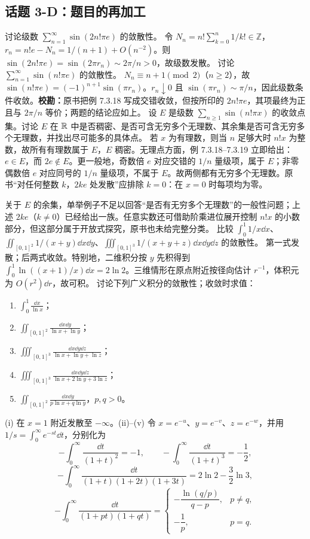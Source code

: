 \subsection*{话题 3-D：题目的再加工}
讨论级数 $\sum_{n=1}^\infty\sin(2n!\pi e)$ 的敛散性。
\sol 令 $N_n=n!\sum_{k=0}^n1/k!\in\mathbb Z$，$r_n=n!e-N_n=1/(n+1)+O(n^{-2})$。则 $\sin(2n!\pi e)=\sin(2\pi r_n)\sim2\pi/n>0$，故级数发散。
讨论 $\sum_{n=1}^\infty\sin(n!\pi e)$ 的敛散性。
\sol $N_n\equiv n+1\pmod2$（$n\ge2$），故 $\sin(n!\pi e)=(-1)^{n+1}\sin(\pi r_n)$。$r_n\downarrow0$ 且 $\sin(\pi r_n)\sim\pi/n$，因此级数条件收敛。\textbf{校勘：}原书把例 7.3.18 写成交错收敛，但按所印的 $2n!\pi e$，其项最终为正且与 $2\pi/n$ 等价；两题的结论应如上。
设 $E$ 是级数 $\sum_{n\ge1}\sin(n!\pi x)$ 的收敛点集。讨论 $E$ 在 $\mathbb R$ 中是否稠密、是否可含无穷多个无理数、其余集是否可含无穷多个无理数，并找出尽可能多的具体点。
\sol 若 $x$ 为有理数，则当 $n$ 足够大时 $n!x$ 为整数，故所有有理数属于 $E$，$E$ 稠密。无理点方面，例 7.3.18--7.3.19 立即给出：$e\in E$，而 $2e\notin E$。更一般地，奇数倍 $e$ 对应交错的 $1/n$ 量级项，属于 $E$；非零偶数倍 $e$ 对应同号的 $1/n$ 量级项，不属于 $E$。故两侧都有无穷多个无理数。原书“对任何整数 $k$，$2ke$ 处发散”应排除 $k=0$：在 $x=0$ 时每项均为零。
\par 关于 $E$ 的余集，单举例子不足以回答“是否有无穷多个无理数”的一般性问题；上述 $2ke$（$k\ne0$）已经给出一族。任意实数还可借助阶乘进位展开控制 $n!x$ 的小数部分，但这部分属于开放式探究，原书也未给完整分类。
比较 $\int_0^1\!1/x\dd x$、$\iint_{[0,1]^2}\!1/(x+y)\dd x\dd y$、$\iiint_{[0,1]^3}\!1/(x+y+z)\dd x\dd y\dd z$ 的敛散性。
\sol 第一式发散；后两式收敛。特别地，二维积分按 $y$ 先积得到 $\int_0^1\ln((x+1)/x)\dd x=2\ln2$。三维情形在原点附近按径向估计 $r^{-1}$，体积元为 $O(r^2)\dd r$，故可积。
讨论下列广义积分的敛散性；收敛时求值：
\begin{enumerate}[label=(\roman*)]
\item $\displaystyle\int_0^1\frac{\dd x}{\ln x}$；
\item $\displaystyle\iint_{[0,1]^2}\frac{\dd x\dd y}{\ln x+\ln y}$；
\item $\displaystyle\iiint_{[0,1]^3}\frac{\dd x\dd y\dd z}{\ln x+\ln y+\ln z}$；
\item $\displaystyle\iiint_{[0,1]^3}\frac{\dd x\dd y\dd z}{\ln x+2\ln y+3\ln z}$；
\item $\displaystyle\iint_{[0,1]^2}\frac{\dd x\dd y}{p\ln x+q\ln y}$，$p,q>0$。
\end{enumerate}
\sol (i) 在 $x=1$ 附近发散至 $-\infty$。(ii)--(v) 令 $x=e^{-u}$、$y=e^{-v}$、$z=e^{-w}$，并用 $1/s=\int_0^\infty e^{-st}\dd t$，分别化为
\[-\int_0^\infty\frac{\dd t}{(1+t)^2}=-1,\qquad
-\int_0^\infty\frac{\dd t}{(1+t)^3}=-\frac12,\]
\[-\int_0^\infty\frac{\dd t}{(1+t)(1+2t)(1+3t)}=2\ln2-\frac32\ln3,\]
\[-\int_0^\infty\frac{\dd t}{(1+pt)(1+qt)}=
\begin{cases}-\dfrac{\ln(q/p)}{q-p},&p\ne q,\\-\dfrac1p,&p=q.\end{cases}\]
